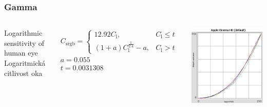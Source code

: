 \begin{frame}
    \frametitle{Gamma}

    \begin{columns}[c]
        Logarithmic sensitivity of human eye\\
        Logaritmická citlivost oka

        \begin{eqnarray*}
        C_\mathrm{srgb}=\begin{cases}
        12.92C_\mathrm{l}, & C_\mathrm{l} \le t\\
        (1+a)C_\mathrm{l}^{\frac{1}{2.4}}-a, & C_\mathrm{l} > t
        \end{cases} \\
        a = 0.055 \\
        t = 0.0031308
        \end{eqnarray*}
        
        \includegraphics[width=\textwidth]{pics/color/monitor}
    \end{columns}
\end{frame}

